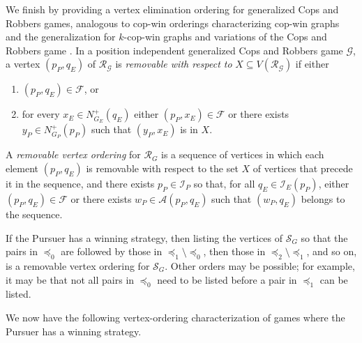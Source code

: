 \documentclass[12pt,reqno]{amsart}
\begin{document}
\medskip

We finish by providing a vertex elimination ordering for generalized Cops and Robbers games, analogous to cop-win orderings characterizing cop-win graphs and the generalization for $k$-cop-win graphs
and variations of the Cops and Robbers game  \cite{cm,NW}. In a position independent generalized Cops and Robbers game $\mathcal{G}$, a vertex $(p_P,q_E)$ of $\mathcal{R}_{\mathcal{G}}$ is
\emph{removable with respect to} $X \subseteq V(\mathcal{R}_{\mathcal{G}})$ if either
\begin{enumerate}
\item $(p_P,q_E) \in \mathcal{F}$, or
\item for every $x_E \in N^+_{G_E}(q_E)$ either $(p_P, x_E) \in \mathcal{F}$ or there exists $y_P \in N^+_{G_P}(p_P)$ such that $(y_P, x_E)$ is in $X$.
\end{enumerate}
A \emph{removable vertex ordering} for $\mathcal{R}_G$ is a sequence of vertices in which each element $(p_P, q_E)$ is removable with respect to the set $X$ of vertices that precede it in the
sequence, and there exists $p_P \in \mathcal{I}_P$ so that, for all $q_E \in \mathcal{I}_E(p_P)$, either $(p_P, q_E) \in \mathcal{F}$ or there exists $w_P \in \mathcal{A}(p_P, q_E)$ such that $(w_P,
q_E)$ belongs to the sequence.

If the Pursuer has a winning strategy, then listing the vertices of $\mathcal{S}_G$ so that the pairs in $\preceq_0$ are followed by those in $\preceq_1 \setminus \preceq_0$, then those in $\preceq_2
\setminus \preceq_1$, and so on, is a removable vertex ordering for $\mathcal{S}_G$.  Other orders may be possible; for example, it may be that not all  pairs in $\preceq_0$ need to be listed before
a pair in  $\preceq_1$ can be listed.

We now have the following vertex-ordering characterization of games where the Pursuer has a winning strategy.
\end{document}

